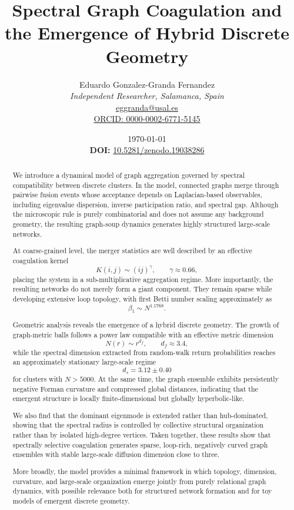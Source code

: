\documentclass[11pt]{article}
\title{Spectral Graph Coagulation and the Emergence of Hybrid Discrete Geometry}
\author{Eduardo Gonzalez-Granda Fernandez\\
\textit{Independent Researcher, Salamanca, Spain}\\
\href{mailto:eggranda@usal.es}{eggranda@usal.es}\\
\href{https://orcid.org/0000-0002-6771-5145}{ORCID: 0000-0002-6771-5145}
}
\date{\today \\ \vspace{0.4cm} 
\textbf{DOI:} \href{https://doi.org/10.5281/zenodo.xxx}{10.5281/zenodo.19038286}}
\begin{document}
\maketitle

\begin{abstract}
We introduce a dynamical model of graph aggregation governed by spectral compatibility between discrete clusters.
In the model, connected graphs merge through pairwise fusion events whose acceptance depends on Laplacian-based observables, including eigenvalue dispersion, inverse participation ratio, and spectral gap.
Although the microscopic rule is purely combinatorial and does not assume any background geometry, the resulting graph-soup dynamics generates highly structured large-scale networks.

At coarse-grained level, the merger statistics are well described by an effective coagulation kernel
\[
K(i,j)\sim (ij)^\gamma,
\qquad
\gamma \approx 0.66,
\]
placing the system in a sub-multiplicative aggregation regime.
More importantly, the resulting networks do not merely form a giant component.
They remain sparse while developing extensive loop topology, with first Betti number scaling approximately as
\[
\beta_1 \sim N^{1.1768}.
\]

Geometric analysis reveals the emergence of a hybrid discrete geometry.
The growth of graph-metric balls follows a power law compatible with an effective metric dimension
\[
N(r)\sim r^{d_f},
\qquad
d_f \approx 3.4,
\]
while the spectral dimension extracted from random-walk return probabilities reaches an approximately stationary large-scale regime
\[
d_s = 3.12 \pm 0.40
\]
for clusters with $N>5000$.
At the same time, the graph ensemble exhibits persistently negative Forman curvature and compressed global distances, indicating that the emergent structure is locally finite-dimensional but globally hyperbolic-like.

We also find that the dominant eigenmode is extended rather than hub-dominated, showing that the spectral radius is controlled by collective structural organization rather than by isolated high-degree vertices.
Taken together, these results show that spectrally selective coagulation generates sparse, loop-rich, negatively curved graph ensembles with stable large-scale diffusion dimension close to three.

More broadly, the model provides a minimal framework in which topology, dimension, curvature, and large-scale organization emerge jointly from purely relational graph dynamics, with possible relevance both for structured network formation and for toy models of emergent discrete geometry.
\end{abstract}
\end{document}
